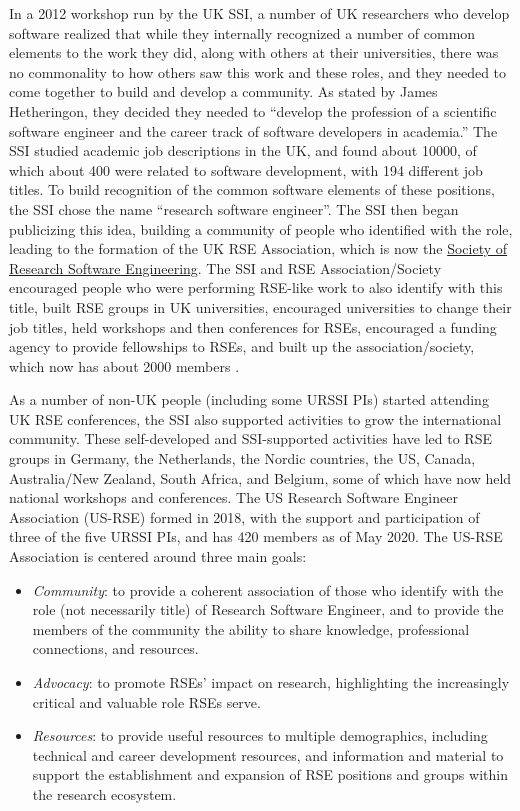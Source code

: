 \documentclass[
]{book}
\begin{document}
In a 2012 workshop run by the UK SSI, a number of UK researchers who develop
software realized that while they internally recognized a number of common elements
to the work they did, along with others at their universities, there was no
commonality to how others saw this work and these roles, and they needed to come
together to build and develop a community. As stated by James Hetheringon, they
decided they needed to ``develop the profession of a scientific software engineer
and the career track of software developers in academia.'' The SSI studied academic job
descriptions in the UK, and found about 10000, of which about 400 were related to
software development, with 194 different job titles. To build recognition of the
common software elements of these positions, the SSI chose the name ``research software
engineer''. The SSI then began publicizing this idea, building a community of people who
identified with the role, leading to the formation of the UK RSE Association, which is
now the \href{https://society-rse.org}{Society of Research Software Engineering}.
The SSI and RSE Association/Society encouraged people who were performing RSE-like work
to also identify with this title,
built RSE groups in UK universities, encouraged universities to change their
job titles, held workshops and then conferences for RSEs, encouraged a funding
agency to provide fellowships to RSEs, and built up the association/society,
which now has about 2000 members \citep{RSEHettrick}.

As a number of non-UK people (including some URSSI PIs) started attending UK RSE
conferences, the SSI also supported activities to grow the international community.
These self-developed and SSI-supported activities have led to RSE groups in Germany,
the Netherlands, the Nordic countries, the US, Canada, Australia/New Zealand, South Africa, and Belgium, some of
which have now held national workshops and conferences. The US Research Software
Engineer Association (US-RSE) formed in 2018, with the support and participation
of three of the five URSSI PIs, and has 420 members as of May 2020. The US-RSE
Association is centered around three main goals:

\begin{itemize}
\item
  \emph{Community}: to provide a coherent association of those who identify with the role
  (not necessarily title) of Research Software Engineer, and to provide the members
  of the community the ability to share knowledge, professional connections, and resources.
\item
  \emph{Advocacy}: to promote RSEs' impact on research, highlighting the increasingly
  critical and valuable role RSEs serve.
\item
  \emph{Resources}: to provide useful resources to multiple demographics, including technical
  and career development resources, and information and material to support the
  establishment and expansion of RSE positions and groups within the research ecosystem.
\end{itemize}
\end{document}
